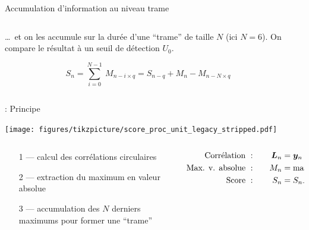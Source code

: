 \documentclass[../main.tex]{subfiles}
\begin{document}
\begin{frame}{Accumulation d'information au niveau trame}
  \begin{columns}
    \begin{column}{.5\linewidth}
      \begin{overlayarea}{\linewidth}{.875\textheight}
        \dots~et on les accumule sur la durée d'une ``trame'' de taille $N$ (ici $N = 6$). On compare le résultat à un seuil de détection $U_0$. \vspace{-1.75em}

        $$S_n = \sum_{i = 0}^{N - 1}\:M_{n - i \times q} = S_{n - q} + M_{n} - M_{n - N \times q}$$ \vspace{-2em}
        \begin{center}
          \resizebox{.6\linewidth}{!}{
            
          }
        \end{center}
      \end{overlayarea}
    \end{column}
    \begin{column}{.5\linewidth}
      \centering
      \resizebox{\linewidth}{!}{
        
      }
    \end{column}
  \end{columns}
\end{frame}

\begin{frame}{\subsecname : {Principe}}
  \begin{center}
    \texttt{[image: figures/tikzpicture/score\_proc\_unit\_legacy\_stripped.pdf]}
  \end{center}
  \begin{columns}
    \begin{column}{.5\linewidth}
      \centering
      \begin{itemize}
        \item [1 ---] calcul des corrélations circulaires
        \item [2 ---] extraction du maximum en valeur absolue
        \item [3 ---] accumulation des $N$ derniers maximums pour former une ``trame''
      \end{itemize}
    \end{column}
    \begin{column}{.5\linewidth}
      \centering
      \begin{align*}
        \text{Corrélation } & :\quad & \bm{L}_n & = \bm{y}_n \star \bm{P}_{0}               \\
        \text{Max. v. absolue } & :\quad & M_n        & = \mathrm{max}(|\bm{L}_n|)             \\
        \text{Score }       & :\quad & S_n        & = S_{n - q} + M_{n} - M_{n - N \times q}
      \end{align*}
    \end{column}
  \end{columns}
\end{frame}
\end{document}
